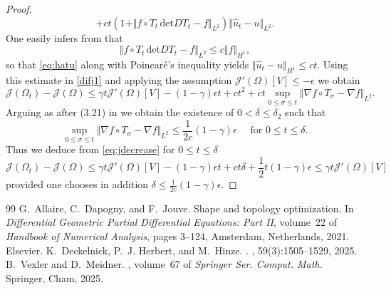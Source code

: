 \documentclass[10pt,a4paper]{amsart}
\begin{document}
\begin{proof}
\begin{equation}
+ c t(1+ \Vert  f \circ T_t  \, \mbox{det} D T_t -f \Vert_{L^2})  \Vert \hat u_t -u \Vert_{L^2}.
\end{equation}
One easily infers from \cite[(3.13)]{DHH25-convergence} that
\begin{displaymath}
\Vert  f \circ T_t  \, \mbox{det} D T_t -f \Vert_{L^2} \leq c
\Vert f \Vert_{H^1},
\end{displaymath}
so that \eqref{eq:hatu} along with Poincar\'e's inequality yields
$ \Vert \hat u_t - u \Vert_{H^1} \leq ct$.
Using this estimate in 
\eqref{difj1} and applying the assumption  $\mathcal J'(\Omega)[V] \leq - \epsilon$ we obtain
\begin{equation} \label{eq:jdecrease}
\mathcal J(\Omega_t) - \mathcal J(\Omega) 
 \leq  \gamma t \mathcal J'(\Omega)[V] -(1-\gamma) \epsilon t   + c t^2  + c t  \sup_{0 \leq \sigma \leq t} \Vert \nabla f \circ T_\sigma - \nabla f \Vert_{L^2}. 
\end{equation}
Arguing as after (3.21) in \cite{DHH25-convergence} we obtain
the existence of $0< \delta \leq \delta_2$ such that
\begin{displaymath}
\sup_{0 \leq \sigma \leq t} \Vert \nabla f \circ T_\sigma - \nabla f \Vert_{L^2} \leq 
\frac{1}{2c} (1-\gamma)   \epsilon \quad \mbox{ for } 0 \leq t \leq  \delta.
\end{displaymath}
Thus we deduce from \eqref{eq:jdecrease} for $0 \leq t \leq \delta$
\begin{displaymath}
\mathcal J(\Omega_t) - \mathcal J(\Omega)
 \leq   \gamma t \mathcal J'(\Omega)[V] -(1-\gamma) \epsilon t
 + c t \delta + \frac{1}{2} t(1-\gamma) \epsilon \leq 
 \gamma t \mathcal J'(\Omega)[V]
\end{displaymath}
provided one chooses in addition $\delta \leq \frac{1}{2c}(1-\gamma)
\epsilon$. 
\end{proof}

\begin{thebibliography}{99}
 G.~Allaire, C.~Dapogny, and F.~Jouve. \newblock Shape and topology optimization. \newblock In {\em Differential Geometric Partial Differential Equations: Part II}, volume~22 of {\em Handbook of Numerical Analysis}, pages 3--124, Amsterdam, Netherlands, 2021. Elsevier.
 K.~Deckelnick, P.~J. Herbert, and M.~Hinze. . , 59(3):1505--1529, 2025.
 B.~Vexler and D.~Meidner. , volume~67 of {\em Springer Ser. Comput. Math.} \newblock Springer, Cham, 2025.
\end{thebibliography}
\end{document}
